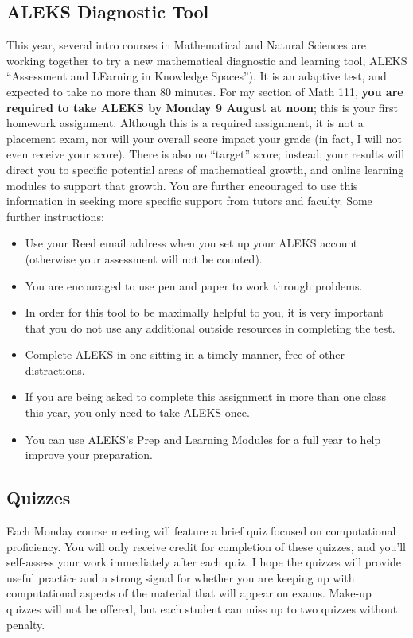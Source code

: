 \documentclass[11pt,twoside]{amsart}
\begin{document}
\subsection*{ALEKS Diagnostic Tool}
This year, several intro courses in Mathematical and Natural Sciences are working together to try a new mathematical diagnostic and learning tool, ALEKS ``Assessment and LEarning in Knowledge Spaces''). It is an adaptive test, and expected to take no more than 80 minutes. For my section of Math 111, \textbf{you are required to take ALEKS by Monday 9 August at noon}; this is your first homework assignment. Although this is a required assignment, it is not a placement exam, nor will your overall score impact your grade (in fact, I will not even receive your score). There is also no ``target'' score; instead, your results will direct you to specific potential areas of mathematical growth, and online learning modules to support that growth. You are further encouraged to use this information in seeking more specific support from tutors and faculty. Some further instructions:
\begin{itemize}
\item Use your Reed email address when you set up your ALEKS account (otherwise your assessment will not be counted).
\item You are encouraged to use pen and paper to work through problems.
\item In order for this tool to be maximally helpful to you, it is very important that you do not use any additional outside resources in completing the test.
\item Complete ALEKS in one sitting in a timely manner, free of other distractions.
\item If you are being asked to complete this assignment in more than one class this year, you only need to take ALEKS once.
\item You can use ALEKS's Prep and Learning Modules for a full year to help improve your preparation.
\end{itemize}

\subsection*{Quizzes}
Each Monday course meeting will feature a brief quiz focused on computational proficiency. You will only receive credit for completion of these quizzes, and you'll self-assess your work immediately after each quiz. I hope the quizzes will provide useful practice and a strong signal for whether you are keeping up with computational aspects of the material that will appear on exams. Make-up quizzes will not be offered, but each student can miss up to two quizzes without penalty.
\end{document}
